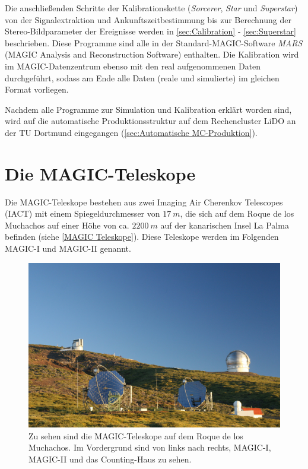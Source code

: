 Die anschließenden Schritte der Kalibrationskette (\textit{Sorcerer}, \textit{Star} und \textit{Superstar}) von der Signalextraktion und Ankunftszeitbestimmung bis zur Berechnung der Stereo-Bildparameter der Ereignisse werden in \autoref{sec:Calibration} - \autoref{sec:Superstar} beschrieben.
Diese Programme sind alle in der Standard-MAGIC-Software \textit{MARS} (MAGIC Analysis and Reconstruction Software)\cite{MARS} enthalten.
Die Kalibration wird im MAGIC-Datenzentrum ebenso mit den real aufgenommenen Daten durchgeführt, sodass am Ende alle Daten (reale und simulierte) im gleichen Format vorliegen.

Nachdem alle Programme zur Simulation und Kalibration erklärt worden sind, wird auf die automatische Produktionsstruktur auf dem Rechencluster LiDO an der TU Dortmund eingegangen (\autoref{sec:Automatische MC-Produktion}).



\section{Die MAGIC-Teleskope}
\label{sec:MAGIC}

Die MAGIC-Teleskope bestehen aus zwei Imaging Air Cherenkov Telescopes (IACT) mit einem Spiegeldurchmesser von $\SI{17}{m}$, die sich auf dem Roque de los Muchachos auf einer Höhe von ca. $\SI{2200}{m}$ auf der kanarischen Insel La Palma befinden (siehe \autoref{MAGIC Teleskope}).
Diese Teleskope werden im Folgenden MAGIC-I und MAGIC-II genannt.

\begin{figure}
    \centering
    \includegraphics[width=\textwidth]{./Plots/03_MonteCarlos/MAGIC-Telescopes.jpg}
    \caption{Zu sehen sind die MAGIC-Teleskope auf dem Roque de los Muchachos. Im Vordergrund sind von links nach rechts, MAGIC-I, MAGIC-II und das Counting-Haus zu sehen.\cite{MAGIC-Homepage}}
    \label{MAGIC Teleskope}
\end{figure}

